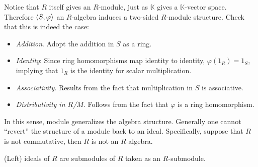 \documentclass{article}
\begin{document}
\begin{remark}
    Notice that $R$ itself gives an $R$-module, just as $\mathbb{K}$ gives a $\mathbb{K}$-vector space. Therefore $\left\langle S, \varphi \right\rangle$ an $R$-algebra induces a two-sided $R$-module structure. Check that this is indeed the case:
    \begin{itemize}
        \item \emph{Addition}. Adopt the addition in $S$ as a ring.
        \item \emph{Identity}: Since ring homomorphisms map identity to identity, $\varphi(1_R) = 1_S$, implying that $1_R$ is the identity for scalar multiplication.
        \item \emph{Associativity}. Results from the fact that multiplication in $S$ is associative.
        \item \emph{Distributivity in $R$/$M$}. Follows from the fact that $\varphi$ is a ring homomorphism.
    \end{itemize}
    In this sense, module generalizes the algebra structure. Generally one cannot ``revert'' the structure of a module back to an ideal. Specifically, suppose that $R$ is not commutative, then $R$ is not an $R$-algebra.
\end{remark}

\begin{remark}
    (Left) ideals of $R$ are submodules of $R$ taken as an $R$-submodule.
\end{remark}
\end{document}
